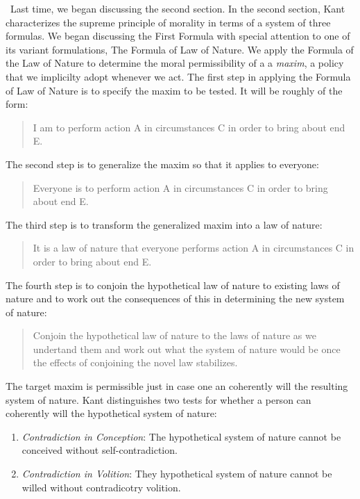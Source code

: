 \change\ Last time, we began discussing the second section. In the second section, Kant characterizes the supreme principle of morality in terms of a system of three formulas. We began discussing the First Formula with special attention to one of its variant formulations, The Formula of Law of Nature. We apply the Formula of the Law of Nature to determine the moral permissibility of a a \emph{maxim}, a policy that we implicilty adopt whenever we act. The first step in applying the Formula of Law of Nature is to specify the maxim to be tested. It will be roughly of the form:
\begin{quote}
    I am to perform action A in circumstances C in order to bring about end E.
\end{quote}
The second step is to generalize the maxim so that it applies to everyone:
\begin{quote}
    Everyone is to perform action A in circumstances C in order to bring about end E.
\end{quote}
The third step is to transform the generalized maxim into a law of nature:
\begin{quote}
    It is a law of nature that everyone performs action A in circumstances C in order to bring about end E.
\end{quote}
The fourth step is to conjoin the hypothetical law of nature to existing laws of nature and to work out the consequences of this in determining the new system of nature:
\begin{quote}
    Conjoin the hypothetical law of nature to the laws of nature as we undertand them and work out what the system of nature would be once the effects of conjoining the novel law stabilizes.
\end{quote}
The target maxim is permissible just in case one an coherently will the resulting system of nature. Kant distinguishes two tests for whether a person can coherently will the hypothetical system of nature:
\begin{enumerate}
    \item \emph{Contradiction in Conception}: The hypothetical system of nature cannot be conceived without self-contradiction.
    \item \emph{Contradiction in Volition}: They hypothetical system of nature cannot be willed without contradicotry volition.
\end{enumerate}

